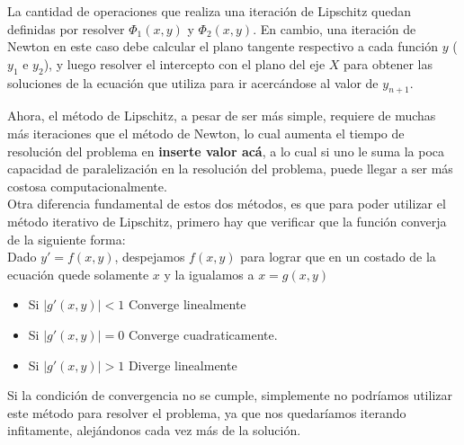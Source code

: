 La cantidad de operaciones que realiza una iteración de Lipschitz quedan
definidas por resolver $\Phi_1 (x,y)$ y $\Phi_2 (x,y)$. En cambio, una
iteración de Newton en este caso debe calcular el plano tangente respectivo a
cada función $y$ ($y_1$ e $y_2$), y luego resolver el intercepto con el plano
del eje $X$ para obtener las soluciones de la ecuación que utiliza para ir
acercándose al valor de $y_{n+1}$.

Ahora, el método de Lipschitz, a pesar de ser más simple, requiere de muchas
más iteraciones que el método de Newton, lo cual aumenta el tiempo de
resolución del problema en \textbf{inserte valor acá}, a lo cual si uno le suma la
poca capacidad de paralelización en la resolución del problema, puede llegar a
ser más costosa computacionalmente. 
\\
Otra diferencia fundamental de estos dos métodos, es que para poder utilizar
el método iterativo de Lipschitz, primero hay que verificar que la función
converja de la siguiente forma:\\
Dado $y'=f(x,y)$, despejamos $f(x,y)$ para lograr que en un costado de la
ecuación quede solamente $x$ y la igualamos a $x=g(x,y)$
\begin{itemize}
	\item Si $|g'(x,y)|< 1$ Converge linealmente
	\item Si $|g'(x,y)|= 0$ Converge cuadraticamente.
	\item Si $|g'(x,y)|> 1$ Diverge linealmente
\end{itemize}

Si la condición de convergencia no se cumple, simplemente no podríamos
utilizar este método para resolver el problema, ya que nos quedaríamos iterando
infitamente, alejándonos cada vez más de la solución.
